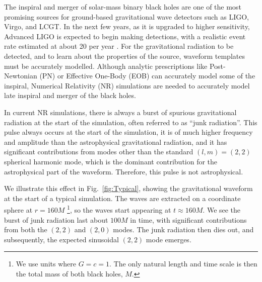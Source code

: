 \documentclass[aps,prd,amsmath,floatfix,twocolumn,superscriptaddress,nofootinbib,showpacs]{revtex4-1}
\theoremstyle{plain}
\theoremstyle{definition}
\begin{document}
The inspiral and merger of solar-mass binary black holes are one of
the most promising sources for ground-based gravitational wave
detectors such as LIGO\cite{Barish:1999},
Virgo\cite{Acernese-etal:2006}, and LCGT\cite{Kuroda:2010}. In the
next few years, as it is upgraded to higher sensitivity, Advanced
LIGO is expected to begin making detections, with a realistic event
rate estimated at about 20 per year \cite{Abadie:2010cfa}.
For the gravitational radiation to be detected, and to learn about the
properties of the source, waveform templates must be accurately
modelled.  Although analytic prescriptions like Post-Newtonian (PN)\cite{Blanchet2006} or
Effective One-Body (EOB)\cite{Buonanno99} can accurately model some of the inspiral,
Numerical Relativity (NR) simulations are needed to accurately model
late inspiral and merger of the black holes.

In current NR simulations, there is always a burst of spurious
gravitational radiation at the start of the simulation, often referred to as
``junk radiation''. This pulse
always occurs at the start of the simulation, it is of much higher frequency and amplitude
than the astrophysical gravitational radiation, and it has significant
contributions from modes other than the standard $(l,m) = (2,2)$
spherical harmonic mode, which is the dominant contribution for the
astrophysical part of the waveform.  Therefore, this pulse is not astrophysical.

We illustrate this effect in Fig.~\ref{fig:Typical}, showing the
gravitational waveform  at the start of a
typical simulation. The waves are extracted on a coordinate sphere at
$r=160M$ \footnote{We use units where $G=c=1$. The only natural length
  and time scale is then the total mass of both black holes, $M$.}, so
the waves start appearing at $t\approx 160M$. We see the burst of junk
radiation last about $100M$ in time, with significant contributions
from both the $(2,2)$ and $(2,0)$ modes. The junk radiation then dies out,
and subsequently, the expected sinusoidal $(2,2)$ mode emerges.
\end{document}
